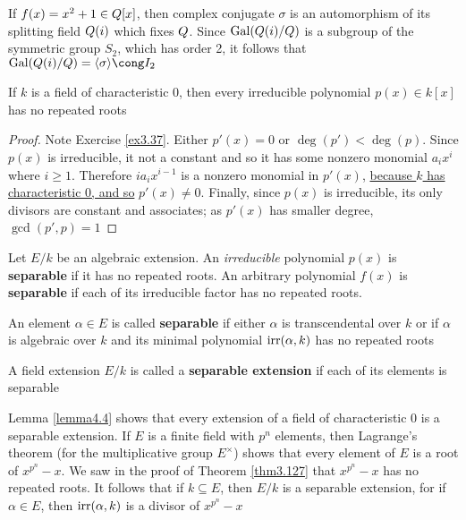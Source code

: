 \documentclass[11pt]{article}
\begin{document}
If \(f(x)=x^2+1\in\relax{Q}[x]\), then complex conjugate \(\sigma\) is an automorphism of its
splitting field \(\relax{Q}(i)\) which fixes \(\relax{Q}\). Since \(\operatorname{Gal}(\relax{Q}(i)/\relax{Q})\) is a
subgroup of the symmetric group \(S_2\), which has order 2, it follows that 
\(\Gal(\Q(i)/\Q)=\la\sigma\ra\cong\I_2\)

\begin{lemma}[]
\label{lemma4.4}
If \(k\) is a field of characteristic 0, then every irreducible polynomial 
\(p(x)\in k[x]\) has no repeated roots
\end{lemma}

\begin{proof}
Note Exercise \ref{ex3.37}. Either \(p'(x)=0\) or \(\deg(p')<\deg(p)\).
Since \(p(x)\) is irreducible, it not a constant and so it has some nonzero
monomial \(a_ix^i\) where \(i\ge1\). Therefore \(ia_ix^{i-1}\) is a nonzero
monomial in \(p'(x)\), \uline{because \(k\) has characteristic 0, and so} 
\uline{\(p'(x)\neq 0\)}. Finally, since \(p(x)\) is irreducible, its only divisors
are constant and associates; as \(p'(x)\) has smaller degree, \(\gcd(p',p)=1\)
\end{proof}

\begin{definition}[]
Let \(E/k\) be an algebraic extension. An \emph{irreducible} polynomial \(p(x)\) is
\textbf{separable} if it has no repeated roots. An arbitrary polynomial \(f(x)\) is
\textbf{separable} if each of its irreducible factor has no repeated roots.

An element \(\alpha\in E\) is called \textbf{separable} if either \(\alpha\) is transcendental
over \(k\) or if \(\alpha\) is algebraic over \(k\) and its minimal polynomial
\(\operatorname{irr}(\alpha,k)\) has no repeated roots

A field extension \(E/k\) is called a \textbf{separable extension} if each of its
elements is separable
\end{definition}

Lemma \ref{lemma4.4} shows that every extension of a field of characteristic 0
is a separable extension. If \(E\) is a finite field with \(p^n\) elements, then
Lagrange's theorem (for the multiplicative group \(E^\times\)) shows that every
element of \(E\) is a root of \(x^{p^n}-x\). We saw in the proof of Theorem
\ref{thm3.127} that \(x^{p^n}-x\) has no repeated roots. It follows that 
if \(k\subseteq E\), then \(E/k\) is a separable extension, for if
\(\alpha\in E\), then \(\operatorname{irr}(\alpha,k)\) is a divisor of \(x^{p^n}-x\)
\end{document}
